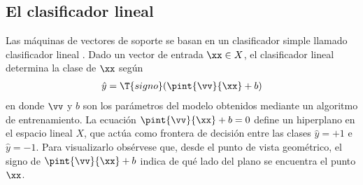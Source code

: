 %
%
\subsection{El clasificador lineal}
%
Las máquinas de vectores de soporte se basan en un clasificador simple
llamado clasificador lineal \cite{nilsson}.
Dado un vector de entrada $\xx\in{}X$, el clasificador lineal
determina la clase de $\xx$ según
%
\begin{align*}
  \hat{y} = \T{signo}(\pint{\vv}{\xx}+b)
\end{align*}
%
en donde $\vv$ y $b$ son los parámetros del modelo obtenidos mediante
un algoritmo de entrenamiento.
La ecuación $\pint{\vv}{\xx}+b=0$ define un hiperplano en el
espacio lineal $X$, que actúa como frontera de decisión entre las
clases $\hat{y}=+1$ e $\hat{y}=-1$.
Para visualizarlo obsérvese que, desde el punto de vista geométrico,
el signo de $\pint{\vv}{\xx}+b$ indica de qué lado del plano se
encuentra el punto $\xx$.
